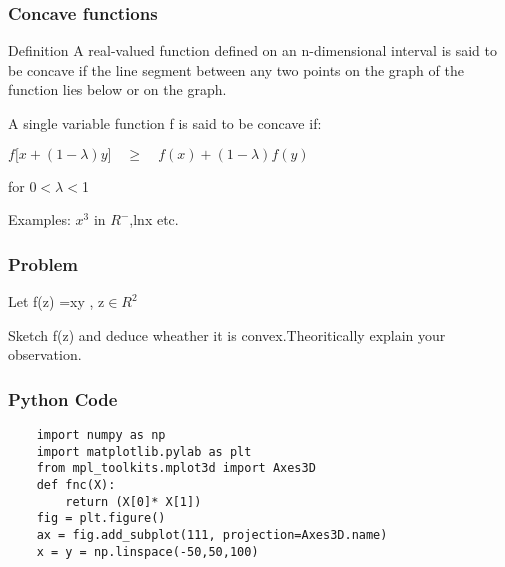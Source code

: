 \documentclass{beamer}
\begin{document}
\begin{frame}
\frametitle{Concave functions} %
\begin{block}{Definition}
A real-valued function defined on an n-dimensional interval is said to be concave if the line segment between any two points on the graph of the function lies below or on the graph.
\end{block}

A single variable function f is said to be concave if:\newline

\quad \quad \quad \quad \quad  $f[$\lambda$x+(1-\lambda)y] \quad \geq  \quad $\lambda$f(x)+(1-\lambda)f(y)$\newline

\quad \quad \quad \quad \quad \quad\quad \quad \quad \quad \quad \quadfor for 0$<$$\lambda$$<$1\newline

Examples: $x^{3}$ in $R^{-}$,lnx etc.



\end{frame}
\begin{frame}
\frametitle{Problem}
Let f(z) =xy , z$\in$$R^{2}$\newline

Sketch f(z) and deduce wheather it is convex.Theoritically explain your observation.

\end{frame}



\begin{frame}[fragile] %
\frametitle{Python Code}
\begin{example}
\begin{verbatim}
    import numpy as np
    import matplotlib.pylab as plt
    from mpl_toolkits.mplot3d import Axes3D
    def fnc(X):
        return (X[0]* X[1])
    fig = plt.figure()
    ax = fig.add_subplot(111, projection=Axes3D.name)
    x = y = np.linspace(-50,50,100)
   
\end{verbatim}
\end{example}
\end{frame}
\end{document}
